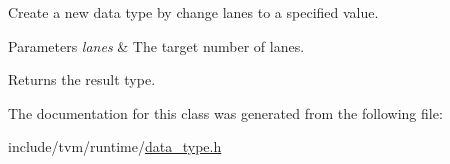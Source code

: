 Create a new data type by change lanes to a specified value. 


\begin{DoxyParams}{Parameters}
{\em lanes} & The target number of lanes. \\
\hline
\end{DoxyParams}
\begin{DoxyReturn}{Returns}
the result type. 
\end{DoxyReturn}


The documentation for this class was generated from the following file\+:\begin{DoxyCompactItemize}
\item 
include/tvm/runtime/\hyperlink{data__type_8h}{data\+\_\+type.\+h}\end{DoxyCompactItemize}
